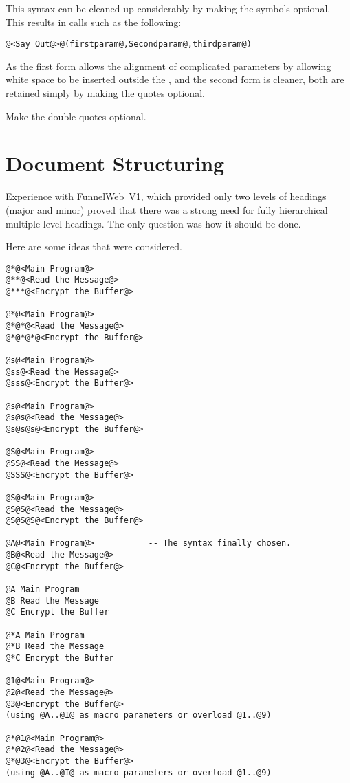 This syntax can be cleaned up considerably by making the  symbols
optional. This results in calls such as the following:

\begin{verbatim}
@<Say Out@>@(firstparam@,Secondparam@,thirdparam@)
\end{verbatim}

As the first form allows the alignment of complicated parameters by
allowing white space to be inserted outside the , and the second
form is cleaner, both are retained simply by making the quotes optional.

 Make the double quotes optional.

\section{Document Structuring}

Experience with FunnelWeb~V1, which provided only two levels of
headings (major and minor)
proved that there was a strong need for fully hierarchical
multiple-level headings.
The only question was how it should be done.

Here are some ideas that were considered.

\begin{verbatim}
@*@<Main Program@>
@**@<Read the Message@>
@***@<Encrypt the Buffer@>

@*@<Main Program@>
@*@*@<Read the Message@>
@*@*@*@<Encrypt the Buffer@>

@s@<Main Program@>
@ss@<Read the Message@>
@sss@<Encrypt the Buffer@>

@s@<Main Program@>
@s@s@<Read the Message@>
@s@s@s@<Encrypt the Buffer@>

@S@<Main Program@>
@SS@<Read the Message@>
@SSS@<Encrypt the Buffer@>

@S@<Main Program@>
@S@S@<Read the Message@>
@S@S@S@<Encrypt the Buffer@>

@A@<Main Program@>           -- The syntax finally chosen.
@B@<Read the Message@>
@C@<Encrypt the Buffer@>

@A Main Program
@B Read the Message
@C Encrypt the Buffer

@*A Main Program
@*B Read the Message
@*C Encrypt the Buffer

@1@<Main Program@>
@2@<Read the Message@>
@3@<Encrypt the Buffer@>
(using @A..@I@ as macro parameters or overload @1..@9)

@*@1@<Main Program@>
@*@2@<Read the Message@>
@*@3@<Encrypt the Buffer@>
(using @A..@I@ as macro parameters or overload @1..@9)
\end{verbatim}


